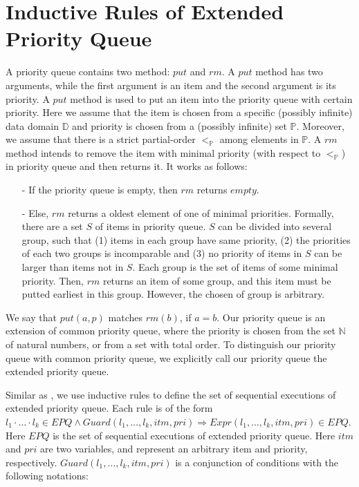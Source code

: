 \section{Inductive Rules of Extended Priority Queue}
\label{sec:inductive rules of extended priority queue}

A priority queue contains two method: $\textit{put}$ and $\textit{rm}$. A $\textit{put}$ method has two arguments, while the first argument is an item and the second argument is its priority. A $\textit{put}$ method is used to put an item into the priority queue with certain priority. Here we assume that the item is chosen from a specific (possibly infinite) data domain $\mathbb{D}$ and priority is chosen from a (possibly infinite) set $\mathbb{P}$. {\color {red}Moreover, we assume that there is a strict partial-order $<_\mathbb{P}$ among elements in $\mathbb{P}$.} A $\textit{rm}$ method intends to remove the item with minimal priority (with respect to $<_\mathbb{P}$) in priority queue and then returns it. It works as follows:

\begin{itemize}
\setlength{\itemsep}{0.5pt}
\item[-] If the priority queue is empty, then $\textit{rm}$ returns $\textit{empty}$.

\item[-] {\color {red}Else, $\textit{rm}$ returns a oldest element of one of minimal priorities. Formally, there are a set $S$ of items in priority queue. $S$ can be divided into several group, such that (1) items in each group have same priority, (2) the priorities of each two groups is incomparable and (3) no priority of items in $S$ can be larger than items not in $S$. Each group is the set of items of some minimal priority. Then, $\textit{rm}$ returns an item of some group, and this item must be putted earliest in this group. However, the chosen of group is arbitrary.}
\end{itemize}

We say that $\textit{put}(a,p)$ matches $\textit{rm}(b)$, if $a = b$. Our priority queue is an extension of common priority queue, where the priority is chosen from the set $\mathbb{N}$ of natural numbers, or from a set with total order. To distinguish our priority queue with common priority queue, we explicitly call our priority queue the extended priority queue.

Similar as \cite{Bouajjani:2015}, we use inductive rules to define the set of sequential executions of extended priority queue. Each rule is of the form $l_1 \cdot \ldots \cdot l_k \in \textit{EPQ} \wedge \textit{Guard}(l_1,\ldots,l_k,\textit{itm},\textit{pri}) \Rightarrow \textit{Expr}(l_1,\ldots,l_k,\textit{itm},\textit{pri}) \in \textit{EPQ}$. Here $\textit{EPQ}$ is the set of sequential executions of extended priority queue. Here $\textit{itm}$ and $\textit{pri}$ are two variables, and represent an arbitrary item and priority, respectively. $\textit{Guard}(l_1,\ldots,l_k,\textit{itm},\textit{pri})$ is a conjunction of conditions with the following notations:

